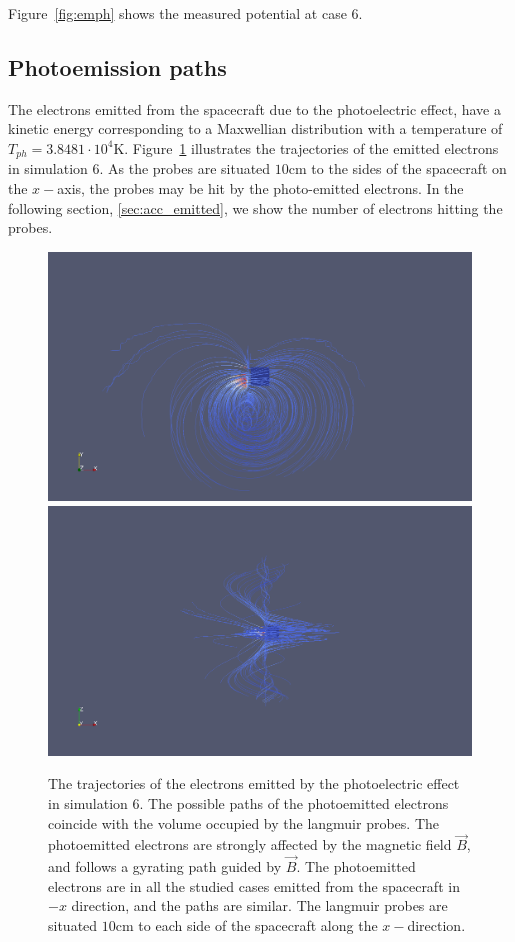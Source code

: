 	Figure~\ref{fig:emph} shows the measured potential at case \(6\).

\subsection{Photoemission paths}

	The electrons emitted from the spacecraft due to the photoelectric effect, have a kinetic
	energy corresponding to a Maxwellian distribution with a temperature of \(T_{ph} =  3.8481\cdot 10^{4} \text{K}\).
	Figure~\ref{fig:trajectories} illustrates the trajectories of the emitted electrons in simulation \(6\).
	As the probes are situated \(10 \text{cm}\) to the sides of the spacecraft on the \(x-\)axis, the probes
	may be hit by the photo-emitted electrons. In the following section, \ref{sec:acc_emitted}, we show the number of electrons hitting
	the probes.


	\begin{figure}
		\includegraphics[width = 0.49 \textwidth]{images/case6_jph_paths}
		\includegraphics[width = 0.49 \textwidth]{images/case6_jph_paths_2}
		\caption{The trajectories of the electrons emitted by the photoelectric effect in simulation \(6\). The possible
		paths of the photoemitted electrons coincide with the volume occupied by the langmuir probes. The photoemitted electrons are strongly affected by the magnetic
		field \(\vec{B}\), and follows a gyrating path guided by \(\vec{B}\). The photoemitted electrons are in all the studied cases
		emitted from the spacecraft in \(-x\) direction, and the paths are similar. The langmuir probes are situated \(10 \text{cm}\) to each side
		of the spacecraft along the \(x-\)direction.}
		\label{fig:trajectories}
	\end{figure}

